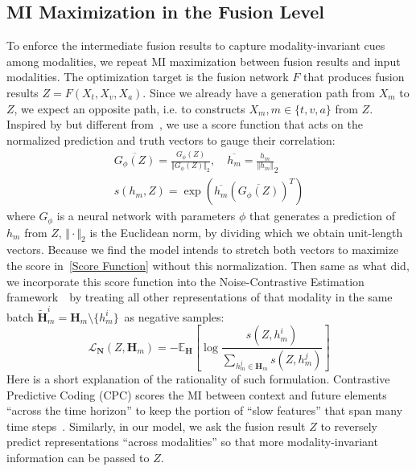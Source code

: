 \documentclass[11pt]{article}
\newcommand{\E}{\mathbb{E}}
\begin{document}
\subsection{MI Maximization in the Fusion Level} \label{CPC}
To enforce the intermediate fusion results to capture modality-invariant cues among modalities, we repeat MI maximization between fusion results and input modalities.
The optimization target is the fusion network $F$ that produces  fusion results $Z=F(X_t, X_v, X_a)$.
Since we already have a generation path from $X_m$ to $Z$, we expect an opposite path, i.e. to constructs $X_m, m\in\{t,v,a\}$ from $Z$. Inspired by but different from~\citet{oord2018representation}, we use a score function that acts on the normalized prediction and truth vectors to gauge their correlation:
\begin{equation}
\begin{gathered}
\overline{G_\phi(Z)} = \frac{G_\phi(Z)}{\Vert G_\phi(Z) \Vert_2}, \quad \overline{h_m} = \frac{h_m}{\Vert h_m \Vert}_2 \\ 
s(h_m, Z)=\exp{\left(\overline{h_m} \left(\overline{G_\phi(Z)}\right)^T\right)}
\end{gathered}
\label{Score Function}
\end{equation}
where $G_\phi$ is a neural network with parameters $\phi$ that generates a prediction of $h_m$ from $Z$, $\Vert \cdot \Vert_2$ is the Euclidean norm, by dividing which we obtain unit-length vectors.
Because we find the model intends to stretch both vectors to maximize the score in~\eqref{Score Function} without this normalization.
Then same as what \citet{oord2018representation} did, we incorporate this score function into the Noise-Contrastive Estimation framework~\citep{gutmann2010noise}~by treating all other representations of that modality in the same batch $\tilde{\mathbf{H}}_m^i = \mathbf{H}_m \setminus \{h_m^i\}$~as negative samples:
\begin{equation}\label{LN}
    \mathcal{L}_{\mathbf{N}}(Z, \mathbf{H}_m) = -\E_{\mathbf{H}}\left[\log \frac{s(Z,h_m^i)}{\sum_{h_m^j \in \mathbf{H}_m}s(Z, h_m^j)} \right]
\end{equation}
Here is a short explanation of the rationality of such formulation.
Contrastive Predictive Coding (CPC) scores the MI between context and future elements ``across the time horizon'' to keep the portion of ``slow features'' that span many time steps~\citep{oord2018representation}.
Similarly, in our model, we ask the fusion result $Z$ to reversely predict representations ``across modalities'' so that more modality-invariant information can be passed to $Z$. 
\end{document}
